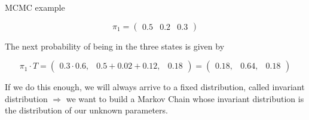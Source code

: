 MCMC example

$$
\pi_1=\begin{pmatrix}0.5 & 0.2& 0.3 \end{pmatrix}
$$

The next probability of being in the three states is given by

$$
\pi_1 \cdot T=\begin{pmatrix}0.3\cdot0.6, & 0.5+0.02+0.12,& 0.18 \end{pmatrix} = \begin{pmatrix}0.18, & 0.64,& 0.18 \end{pmatrix}
$$

If we do this enough, we will always arrive to a fixed distribution,
called invariant distribution $\Rightarrow$ we want to build a Markov
Chain whose invariant distribution is the distribution of our unknown
parameters.


